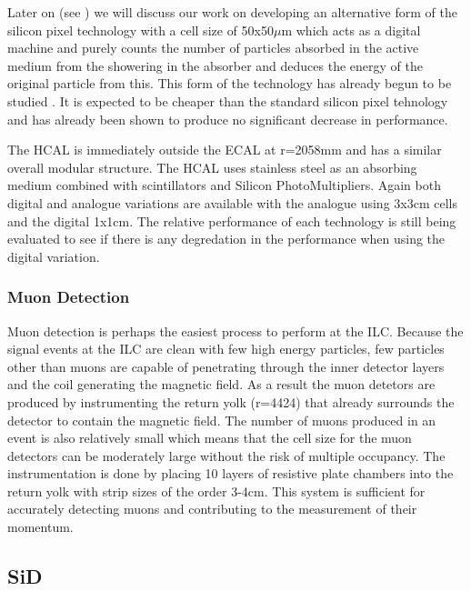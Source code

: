 Later on (see ) we will discuss our work on developing an alternative form of the silicon pixel technology with a cell size of 50x50${\mu}$m which acts as a digital machine and purely counts the number of particles absorbed in the active medium from the showering in the absorber and deduces the energy of the original particle from this.  This form of the technology has already begun to be studied \cite{2011JInst...6.5009B}. It is expected to be cheaper than the standard silicon pixel tehnology and has already been shown to produce no significant decrease in performance.

The \ac{HCAL} is immediately outside the ECAL at r=2058mm and has a similar overall modular structure. The HCAL uses stainless steel as an absorbing medium combined with scintillators and Silicon PhotoMultipliers. Again both digital and analogue variations are available with the analogue using 3x3cm cells and the digital 1x1cm. The relative performance of each technology is still being evaluated to see if there is any degredation in the performance when using the digital variation.

\subsubsection{Muon Detection}
Muon detection is perhaps the easiest process to perform at the ILC. Because the signal events at the ILC are clean with few high energy particles, few particles other than muons are capable of penetrating through the inner detector layers and the coil generating the magnetic field. As a result the muon detetors are produced by instrumenting the return yolk (r=4424) that already surrounds the detector to contain the magnetic field. The number of muons produced in an event is also relatively small which means that the cell size for the muon detectors can be moderately large without the risk of multiple occupancy. The instrumentation is done by placing 10 layers of resistive plate chambers into the return yolk with strip sizes of the order 3-4cm. This system is sufficient for accurately detecting muons and contributing to the measurement of their momentum.

\subsection{SiD}

